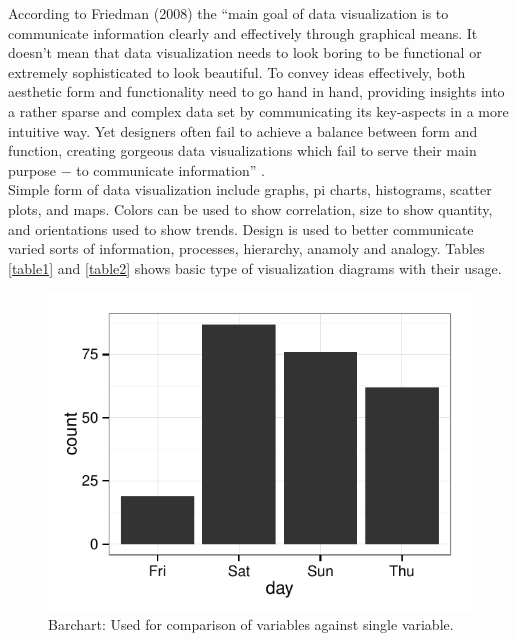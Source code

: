 According to Friedman (2008) the ``main goal of data visualization is to communicate information clearly and effectively through graphical means. It doesn't mean that data visualization needs to look boring to be functional or extremely sophisticated to look beautiful. To convey ideas effectively, both aesthetic form and functionality need to go hand in hand, providing insights into a rather sparse and complex data set by communicating its key-aspects in a more intuitive way. Yet designers often fail to achieve a balance between form and function, creating gorgeous data visualizations which fail to serve their main purpose $-$ to communicate information'' \cite{Intro03}.\\

Simple form of data visualization include graphs, pi charts, histograms, scatter plots, and maps. Colors can be used to show correlation, size to show quantity, and orientations used to show trends. Design is used to better communicate varied sorts of information, processes, hierarchy, anamoly and analogy. Tables \ref{table1} and \ref{table2} shows basic type of visualization diagrams with their usage.


\begin{figure}[htb]
      \includegraphics[width=\columnwidth]{images/barchart.pdf}
      \caption{Barchart: Used for comparison of variables against single variable.}
\end{figure}

